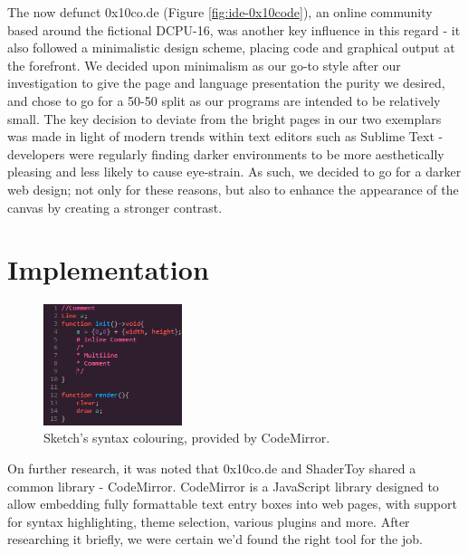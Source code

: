 \documentclass{l3proj}
\begin{document}
The now defunct 0x10co.de (Figure \ref{fig:ide-0x10code}), an online community based around the fictional DCPU-16, was another key influence in this regard - it also followed a minimalistic design scheme, placing code and graphical output at the forefront. We decided upon minimalism as our go-to style after our investigation to give the page and language presentation the purity we desired, and chose to go for a 50-50 split as our programs are intended to be relatively small. The key decision to deviate from the bright pages in our two exemplars was made in light of modern trends within text editors such as Sublime Text - developers were regularly finding darker environments to be more aesthetically pleasing and less likely to cause eye-strain. As such, we decided to go for a darker web design; not only for these reasons, but also to enhance the appearance of the canvas by creating a stronger contrast.

\section{Implementation}
\label{ide-impl}
\begin{figure}
  \centering
  \includegraphics[width=0.36\textwidth]{images/sketch-syntax}
  \caption{Sketch's syntax colouring, provided by CodeMirror.}
  \label{fig:ide-syntax}
\end{figure}
On further research, it was noted that 0x10co.de and ShaderToy shared a common library - CodeMirror. CodeMirror is a JavaScript library designed to allow embedding fully formattable text entry boxes into web pages, with support for syntax highlighting, theme selection, various plugins and more. After researching it briefly, we were certain we'd found the right tool for the job.
\end{document}
